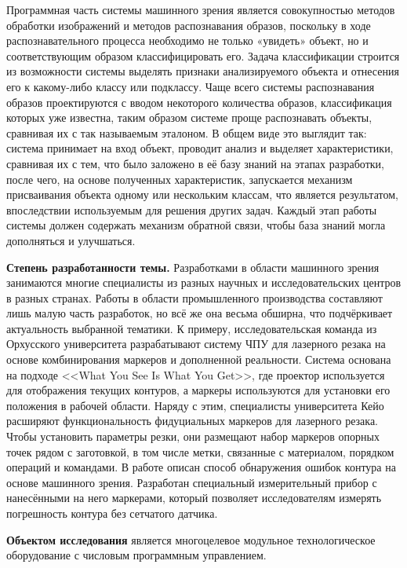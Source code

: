 Программная часть системы машинного зрения является совокупностью методов обработки изображений и методов распознавания образов, поскольку в ходе распознавательного процесса необходимо не только «увидеть» объект, но и соответствующим образом классифицировать его. Задача классификации строится из возможности системы выделять признаки анализируемого объекта и отнесения его к какому-либо классу или подклассу. Чаще всего системы распознавания образов проектируются с вводом некоторого количества образов, классификация которых уже известна, таким образом системе проще распознавать объекты, сравнивая их с так называемым эталоном. В общем виде это выглядит так: система принимает на вход объект, проводит анализ и выделяет характеристики, сравнивая их с тем, что было заложено в её базу знаний на этапах разработки, после чего, на основе полученных характеристик, запускается механизм присваивания объекта одному или нескольким классам, что является результатом, впоследствии используемым для решения других задач. Каждый этап работы системы должен содержать механизм обратной связи, чтобы база знаний могла дополняться и улучшаться.

\textbf{Степень разработанности темы.} Разработками в области машинного зрения занимаются многие специалисты из разных научных и исследовательских центров в разных странах. Работы в области промышленного производства составляют лишь малую часть разработок, но всё же она весьма обширна, что подчёркивает актуальность выбранной тематики. К примеру, исследовательская команда из Орхусского университета разрабатывают систему ЧПУ для лазерного резака на основе комбинирования маркеров и дополненной реальности. Система основана на подходе <<What You See Is What You Get>>, где проектор используется для отображения текущих контуров, а маркеры используются для установки его положения в рабочей области. Наряду с этим, специалисты университета Кейо расширяют функциональность фидуциальных  маркеров для лазерного резака. Чтобы установить параметры резки, они размещают набор маркеров опорных точек рядом с заготовкой, в том числе метки, связанные с материалом, порядком операций и командами. В работе описан способ обнаружения ошибок контура на основе машинного зрения. Разработан специальный измерительный прибор с нанесёнными на него маркерами, который позволяет исследователям измерять погрешность контура без сетчатого датчика.

\textbf{Объектом исследования} является многоцелевое модульное технологическое оборудование с числовым программным управлением.

